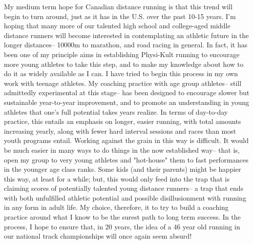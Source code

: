 My medium term hope for Canadian distance running is that this trend will begin to turn around, just as it has in the U.S. over the past 10-15 years. I'm hoping that many more of our talented high school and college-aged middle distance runners will become interested in contemplating an athletic future in the longer distances-- 10000m to marathon, and road racing in general. In fact, it has been one of my principle aims in establishing Physi-Kult running to encourage more young athletes to take this step, and to make my knowledge about how to do it as widely available as I can. I have tried to begin this process in my own work with teenage athletes. My coaching practice with age group athletes-- still admittedly experimental at this stage-- has been designed to encourage slower but sustainable year-to-year improvement, and to promote an understanding in young athletes that one's full potential takes years realize. In terms of day-to-day practice, this entails an emphasis on longer, easier running, with total amounts increasing yearly, along with fewer hard interval sessions and races than most youth programs entail. Working against the grain in this way is difficult. It would be much easier in many ways to do things in the now established way-- that is, open my group to very young athletes and "hot-house" them to fast performances in the younger age class ranks. Some kids (and their parents) might be happier this way, at least for a while; but, this would only feed into the trap that is claiming scores of potentially talented young distance runners-- a trap that ends with both unfulfilled athletic potential and possible disillusionment with running in any form in adult life. My choice, therefore, it to try to build a coaching practice around what I know to be the surest path to long term success. In the process, I hope to ensure that, in 20 years, the idea of a 46 year old running in our national track championships will once again seem absurd!




